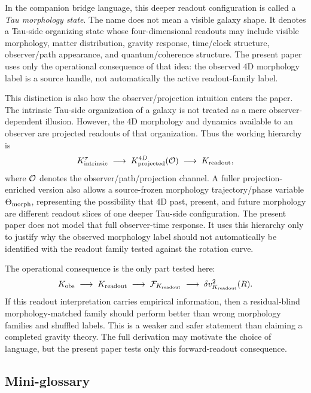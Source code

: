 \documentclass[11pt]{article}
\begin{document}
In the companion bridge language, this deeper readout configuration is called a
\emph{Tau morphology state}.  The name does not mean a visible galaxy shape.
It denotes a Tau-side organizing state whose four-dimensional readouts may
include visible morphology, matter distribution, gravity response, time/clock
structure, observer/path appearance, and quantum/coherence structure.  The
present paper uses only the operational consequence of that idea: the observed
4D morphology label is a source handle, not automatically the active
readout-family label.

This distinction is also how the observer/projection intuition enters the
paper.  The intrinsic Tau-side organization of a galaxy is not treated as a
mere observer-dependent illusion.  However, the 4D morphology and dynamics
available to an observer are projected readouts of that organization.  Thus the
working hierarchy is
\[
K_{\rm intrinsic}^{\tau}
\;\longrightarrow\;
K_{\rm projected}^{4D}({\cal O})
\;\longrightarrow\;
K_{\rm readout},
\]
where \({\cal O}\) denotes the observer/path/projection channel.  A fuller
projection-enriched version also allows a source-frozen morphology
trajectory/phase variable \(\Theta_{\rm morph}\), representing the possibility
that 4D past, present, and future morphology are different readout slices of
one deeper Tau-side configuration.  The present paper does not model that full
observer-time response.  It uses this hierarchy only to justify why the
observed morphology label should not automatically be identified with the
readout family tested against the rotation curve.

The operational consequence is the only part tested here:
\[
K_{\rm obs}
\;\longrightarrow\;
K_{\rm readout}
\;\longrightarrow\;
\mathcal{F}_{K_{\rm readout}}
\;\longrightarrow\;
\delta v^2_{K_{\rm readout}}(R).
\]
If this readout interpretation carries empirical information, then a
residual-blind morphology-matched family should perform better than wrong
morphology families and shuffled labels.  This is a weaker and safer statement
than claiming a completed gravity theory.  The full derivation may motivate the
choice of language, but the present paper tests only this forward-readout
consequence.

\subsection{Mini-glossary}
\end{document}
